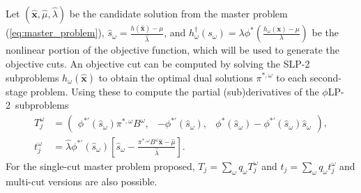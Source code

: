 \documentclass[opre,nonblindrev]{informs3} %
\newcommand{\x}{\mathbf{x}}
\newcommand{\xh}{\hat{\x}}
\newcommand{\lh}{\hat{\lambda}}
\newcommand{\mh}{\hat{\mu}}
\newcommand{\plp}{$\phi$LP-2}
\begin{document}
Let $(\xh,\mh, \lh)$ be the candidate solution from the master problem (\ref{eq:master_problem}), $\hat{s}_\omega = \frac{h(\xh)-\mu}{\lh}$, and $h^\dagger_\omega(s_\omega) = \lambda \phi^*\left(\frac{h_\omega(\x) - \mu}{\lambda}\right)$ be the nonlinear portion of the objective function, which will be used to generate the objective cuts.
An objective cut can be computed by solving the SLP-2 subproblems $h_\omega(\xh)$ to obtain the optimal dual solutions $\pi^{*,\omega}$ to each second-stage problem. Using these to compute the partial (sub)derivatives of the \plp\ subproblems
\begin{align*}
	T_j^\omega & =
	\left( \begin{array}{ccc}
		\phi^{*\prime}(\hat{s}_\omega) \pi^{*,\omega}B^\omega,
			 & -\phi^{*\prime}(\hat{s}_\omega),
			 & \phi^*(\hat{s}_\omega) - \phi^{*\prime}(\hat{s}_\omega) \hat{s}_\omega
	\end{array} \right), \\
	t_j^\omega & = \lh \phi^{*\prime}(\hat{s}_\omega)\left[\hat{s}_\omega - \frac{\pi^{*,\omega}B^\omega\xh - \mh}{\lh}\right].
\end{align*}
For the single-cut master problem proposed, $T_j = \sum_\omega q_\omega T_j^\omega$ and $t_j = \sum_\omega q_\omega t_j^\omega$ and multi-cut versions are also possible. 
\end{document}
